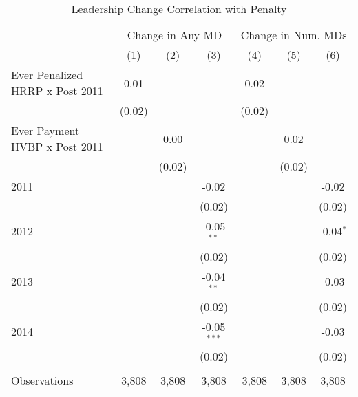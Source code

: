 \begin{table}[htbp]
   \caption{\label{tab:change_analysis} Leadership Change Correlation with Penalty}
   \bigskip
   \centering
   \begin{tabular}{lcccccc}
      \toprule
       & \multicolumn{3}{c}{Change in Any MD} & \multicolumn{3}{c}{Change in Num. MDs}\\
                                      & (1)    & (2)    & (3)           & (4)    & (5)    & (6)\\  
      \midrule 
      Ever Penalized HRRP x Post 2011 & 0.01   &        &               & 0.02   &        &   \\   
                                      & (0.02) &        &               & (0.02) &        &   \\   
      Ever Payment HVBP x Post 2011   &        & 0.00   &               &        & 0.02   &   \\   
                                      &        & (0.02) &               &        & (0.02) &   \\   
      2011                            &        &        & -0.02         &        &        & -0.02\\   
                                      &        &        & (0.02)        &        &        & (0.02)\\   
      2012                            &        &        & -0.05$^{**}$  &        &        & -0.04$^{*}$\\   
                                      &        &        & (0.02)        &        &        & (0.02)\\   
      2013                            &        &        & -0.04$^{**}$  &        &        & -0.03\\   
                                      &        &        & (0.02)        &        &        & (0.02)\\   
      2014                            &        &        & -0.05$^{***}$ &        &        & -0.03\\   
                                      &        &        & (0.02)        &        &        & (0.02)\\   
       \\
      Observations                    & 3,808  & 3,808  & 3,808         & 3,808  & 3,808  & 3,808\\  
      \bottomrule
   \end{tabular}
\end{table}
